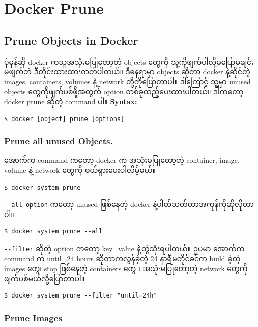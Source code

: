 \documentclass{article}
\begin{document}
\pagebreak

\section{Docker Prune}\label{docker-prune}

\subsection{Prune Objects in Docker}\label{prune-objects-in-docker}

ပုံမှန်ဆို docker ကသူအသုံးမပြုတော့တဲ့ objects ‌တွေကို
သူ့ကိုဖျက်ပါလို့မပြောမချင်း မဖျက်ဘဲ ဒီတိုင်းထားထားတတ်ပါတယ်။ ဒီနေရာမှာ
objects ဆိုတာ docker နဲ့ဆိုင်တဲ့ images, containers, volumes နဲ့ network
တို့ကိုပြောတာပါ။ ဒါကြောင့် သူ့မှာ unused objects တွေကိုဖျက်ပစ်ဖို့အတွက်
option တစ်ခုထည့်ပေးထားပါတယ်။ ဒါကတော့ docker prune ဆိုတဲ့ command ပါ။
\textbf{Syntax:}

\begin{verbatim}
$ docker [object] prune [options]
\end{verbatim}

\subsubsection{Prune all unused
Objects.}\label{prune-all-unused-objects.}

အောက်က command ကတော့ docker က အသုံးမပြုတော့တဲ့ container, image, volume
နဲ့ network တွေကို ဖယ်ရှားပေးပါလိမ့်မယ်။

\begin{verbatim}
$ docker system prune
\end{verbatim}

\texttt{-{}-‌all option} ကတော့ unused ဖြစ်နေတဲ့ docker
နဲ့ပါတ်သတ်တာအကုန်ကိုဆိုလိုတာပါ။

\begin{verbatim}
$ docker system prune --all
\end{verbatim}

\texttt{-{}-filter} ဆိုတဲ့ option ကတော့ key=value နဲ့တွဲသုံးရပါတယ်။ ဥပမာ
အောက်က command က until=24 hours ဆိုတာကလွန်ခဲ့တဲ့ 24 နာရီမတိုင်ခင်က build
ခဲ့တဲ့ images တွေ၊ stop ဖြစ်နေတဲ့ containers တွေ ၊ အသုံးမပြုတော့တဲ့
network တွေကိုဖျက်ပစ်မယ်လို့ပြောတာပါ။

\begin{verbatim}
$ docker system prune --filter "until=24h"
\end{verbatim}

\subsubsection{Prune Images}\label{prune-images}
\end{document}
